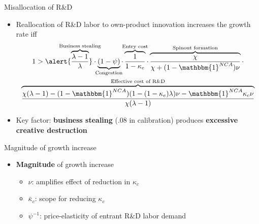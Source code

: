 \documentclass[english,usenames,dvipsnames]{beamer}
\begin{document}
\begin{frame}{Misallocation of R\&D}\label{misallocation_of_rd}
	\begin{itemize}
		\item <+-> Reallocation of R\&D labor to own-product innovation increases the growth rate iff \hyperlink{misallocation_of_rd:derivation}{}
		\footnotesize
		\begin{multline*}
		1 > \alert{\overbrace{\frac{\lambda-1}{\lambda}}^{\mathclap{\text{Business stealing}}}} \cdot \underbrace{(1-\psi)}_{\mathclap{\text{Congestion}}}   \cdot \overbrace{\frac{1}{1-\kappa_{e}}}^{\mathclap{\text{Entry cost}}} \cdot \overbrace{\frac{\chi}{\chi + (1-\mathbbm{1}^{NCA})\nu}}^{\mathclap{\text{Spinout formation}}} \cdot \\ \overbrace{\frac{\chi(\lambda-1) -(1-\mathbbm{1}^{NCA}) (1-(1-\kappa_e)\lambda)\nu - \mathbbm{1}^{NCA} \kappa_c \nu}{\chi(\lambda-1)}}^{\mathclap{\text{Effective cost of R\&D}}}  \label{eq:RD_reallocation} 
		\end{multline*}
		\normalsize
		\item <+-> Key factor: \alert{\textbf{business stealing}} (.08 in calibration) produces \alert{\textbf{excessive creative destruction}} 
	\end{itemize}
\end{frame}

\begin{frame}{Magnitude of growth increase}
	\begin{itemize}
		\item<+-> \alert{\textbf{Magnitude}} of growth increase \hyperlink{magnitude_of_growth_increase}{}
		\begin{itemize}
			\item <+-> $\nu$: amplifies effect of reduction in $\kappa_c$
			\item <+-> $\bar{\kappa}_c$: scope for reducing $\kappa_c$
			\item <+-> $\psi^{-1}$: price-elasticity of entrant R\&D labor demand 
		\end{itemize}
	\end{itemize} 
\end{frame}
\end{document}

